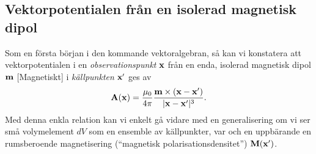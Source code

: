 {{{{{\subsection{Vektorpotentialen fr{\aa}n en isolerad magnetisk dipol}
Som en f{\"o}rsta b{\"o}rjan i den kommande vektoralgebran, s{\aa} kan vi
konstatera att vektorpotentialen i en {\it observationspunkt} ${\bf x}$
 fr{\aa}n en enda, isolerad magnetisk dipol
${\bf m}$ [Magnetiskt] i {\it k{\"a}llpunkten} ${\bf x}'$
 ges av
$$
  {\bf A}({\bf x})={{\mu_0}\over{4\pi}}
    {{{\bf m}\times({\bf x}-{\bf x}')}\over{|{\bf x}-{\bf x}'|^3}}.
$$
\noindent
Med denna enkla relation kan vi enkelt g{\aa} vidare med en generalisering om
vi ser sm{\aa} volymelement $dV$ som en ensemble av k{\"a}llpunkter, var och
en uppb{\"a}rande en rumsberoende magnetisering (``magnetisk
polarisationsdensitet'') ${\bf M}({\bf x}')$.
\vfill\eject

}}}}}
